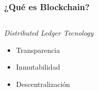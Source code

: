 \documentclass[usenames,dvipsnames]{beamer}
\begin{document}
\begin{frame} 
\frametitle{¿Qué es Blockchain?} 
  \begin{columns}
  \begin{column}{0.5\textwidth}
    \center \textcolor{UniGold}{\emph{Distributed Ledger Tecnology}}
    \begin{itemize}
      \item Transparencia
      \item Inmutabilidad
      \item Descentralización
    \end{itemize}
  \end{column}
  \begin{column}{0.5\textwidth}
\end{column}
\end{columns}
\end{frame}
\end{document}
